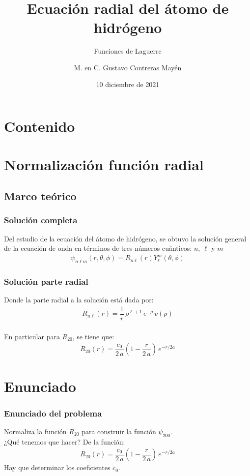 \documentclass[12pt]{beamer}
\date{10 diciembre de 2021}
\title{\large{Ecuación radial del átomo de hidrógeno}}
\subtitle{Funciones de Laguerre}
\author{M. en C. Gustavo Contreras Mayén}
\begin{document}
\maketitle
\fontsize{14}{14}\selectfont
{}

\section*{Contenido}

\section{Normalización función radial}
\subsection{Marco teórico}
\begin{frame}
\frametitle{Solución completa}
Del estudio de la ecuación del átomo de hidrógeno, se obtuvo la solución general de la ecuación de onda en términos de tres números cuánticos: $n$, $\ell$ y $m$
\begin{align*}
\psi_{n \ell m} (r, \theta, \phi) =  R_{n \ell} (r) Y_{\ell}^{m} (\theta, \phi)
\end{align*}
\end{frame}
\begin{frame}
\frametitle{Solución parte radial}
Donde la parte radial a la solución está dada por:
\begin{align*}
R_{n \ell}(r) = \dfrac{1}{r} \, \rho^{\ell + 1} \, e^{-\rho} \, v(\rho)
\end{align*}
\\
\bigskip
\pause
En particular para $R_{20}$, se tiene que:
\begin{align*}
R_{20}(r) = \dfrac{c_{0}}{2 \, a} \left( 1 - \dfrac{r}{2 \, a} \right) \, e^{-r/2a}
\end{align*}
\end{frame}
\section{Enunciado}
\begin{frame}
\frametitle{Enunciado del problema}
Normaliza la función $R_{20}$ para construir la función $\psi_{200}$.
\\
\bigskip
\pause
¿Qué tenemos que hacer? \pause
De la función:
\begin{align*}
R_{20}(r) = \dfrac{c_{0}}{2 \, a} \left( 1 - \dfrac{r}{2 \, a} \right) \, e^{-r/2a}
\end{align*}
Hay que determinar los coeficientes $c_{0}$.
\end{frame}
\end{document}
